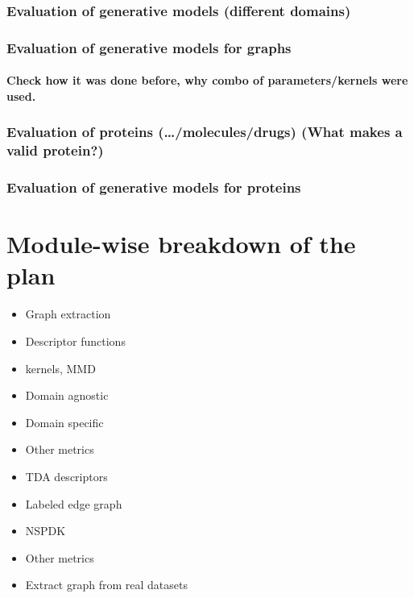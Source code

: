 \documentclass[12pt]{article}
\begin{document}
\subsubsection{Evaluation of generative models (different domains)}
\label{sec:org7833772}
\subsubsection{Evaluation of generative models for graphs}
\label{sec:orgd96e491}
\paragraph{Check how it was done before, why combo of parameters/kernels were used.}
\label{sec:org45ebe8c}
\subsubsection{Evaluation of proteins (…/molecules/drugs) (What makes a valid protein?)}
\label{sec:org0a7ea03}
\subsubsection{Evaluation of generative models for proteins}
\label{sec:org9934110}
\section{Module-wise breakdown of the plan}
\label{sec:org2a8afbe}
\begin{itemize}
\item Graph extraction
\item Descriptor functions
\item kernels, MMD
\item Domain agnostic
\item Domain specific
\item Other metrics
\item TDA descriptors
\item Labeled edge graph
\item NSPDK
\item Other metrics
\item Extract graph from real datasets
\end{itemize}
\end{document}
